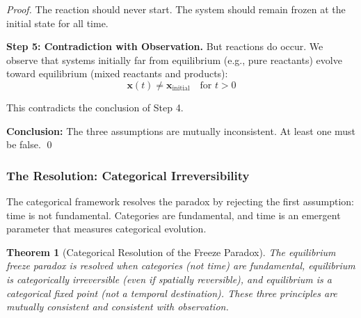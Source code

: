 \documentclass[12pt,a4paper]{article}
\newtheorem{theorem}{Theorem}[section]
\theoremstyle{definition}
\theoremstyle{remark}
\begin{document}
\begin{proof}
The reaction should never start. The system should remain frozen at the initial state for all time.

\textbf{Step 5: Contradiction with Observation.}
But reactions do occur. We observe that systems initially far from equilibrium (e.g., pure reactants) evolve toward equilibrium (mixed reactants and products):
\begin{equation}
\mathbf{x}(t) \neq \mathbf{x}_{\text{initial}} \quad \text{for } t > 0
\end{equation}

This contradicts the conclusion of Step 4.

\textbf{Conclusion:}
The three assumptions are mutually inconsistent. At least one must be false. \qed
\end{proof}

\subsubsection{The Resolution: Categorical Irreversibility}

The categorical framework resolves the paradox by rejecting the first assumption: time is not fundamental. Categories are fundamental, and time is an emergent parameter that measures categorical evolution.

\begin{theorem}[Categorical Resolution of the Freeze Paradox]
\label{thm:freeze_resolution}
The equilibrium freeze paradox is resolved when categories (not time) are fundamental, equilibrium is categorically irreversible (even if spatially reversible), and equilibrium is a categorical fixed point (not a temporal destination). These three principles are mutually consistent and consistent with observation.
\end{theorem}
\end{document}
